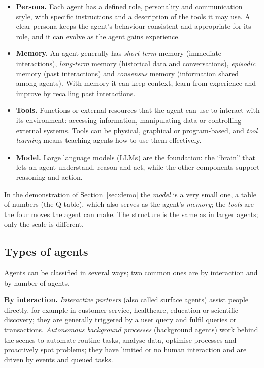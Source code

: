 \documentclass[11pt, a4paper]{article}
\begin{document}
\begin{itemize}
    \item \textbf{Persona.} Each agent has a defined role, personality and communication style, with specific instructions and a description of the tools it may use. A clear persona keeps the agent's behaviour consistent and appropriate for its role, and it can evolve as the agent gains experience.
    \item \textbf{Memory.} An agent generally has \emph{short-term} memory (immediate interactions), \emph{long-term} memory (historical data and conversations), \emph{episodic} memory (past interactions) and \emph{consensus} memory (information shared among agents). With memory it can keep context, learn from experience and improve by recalling past interactions.
    \item \textbf{Tools.} Functions or external resources that the agent can use to interact with its environment: accessing information, manipulating data or controlling external systems. Tools can be physical, graphical or program-based, and \emph{tool learning} means teaching agents how to use them effectively.
    \item \textbf{Model.} Large language models (LLMs) are the foundation: the ``brain'' that lets an agent understand, reason and act, while the other components support reasoning and action.
\end{itemize}

In the demonstration of Section~\ref{sec:demo} the \emph{model} is a very small one, a table of numbers (the Q-table), which also serves as the agent's \emph{memory}; the \emph{tools} are the four moves the agent can make. The structure is the same as in larger agents; only the scale is different.

\subsection{Types of agents}

Agents can be classified in several ways; two common ones are by interaction and by number of agents.

\textbf{By interaction.} \emph{Interactive partners} (also called surface agents) assist people directly, for example in customer service, healthcare, education or scientific discovery; they are generally triggered by a user query and fulfil queries or transactions. \emph{Autonomous background processes} (background agents) work behind the scenes to automate routine tasks, analyse data, optimise processes and proactively spot problems; they have limited or no human interaction and are driven by events and queued tasks.
\end{document}
